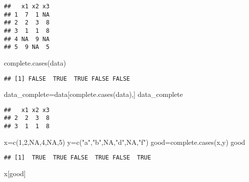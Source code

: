 \documentclass[
]{article}
\newenvironment{Shaded}{\begin{snugshade}}{\end{snugshade}}
\newcommand{\ConstantTok}[1]{\textcolor[rgb]{0.00,0.00,0.00}{#1}}
\newcommand{\DecValTok}[1]{\textcolor[rgb]{0.00,0.00,0.81}{#1}}
\newcommand{\FunctionTok}[1]{\textcolor[rgb]{0.00,0.00,0.00}{#1}}
\newcommand{\NormalTok}[1]{#1}
\newcommand{\OtherTok}[1]{\textcolor[rgb]{0.56,0.35,0.01}{#1}}
\newcommand{\StringTok}[1]{\textcolor[rgb]{0.31,0.60,0.02}{#1}}
\begin{document}
\begin{verbatim}
##   x1 x2 x3
## 1  7  1 NA
## 2  2  3  8
## 3  1  1  8
## 4 NA  9 NA
## 5  9 NA  5
\end{verbatim}

\begin{Shaded}
\begin{Highlighting}[]
\FunctionTok{complete.cases}\NormalTok{(data)}
\end{Highlighting}
\end{Shaded}

\begin{verbatim}
## [1] FALSE  TRUE  TRUE FALSE FALSE
\end{verbatim}

\begin{Shaded}
\begin{Highlighting}[]
\NormalTok{data\_complete}\OtherTok{=}\NormalTok{data[}\FunctionTok{complete.cases}\NormalTok{(data),]}
\NormalTok{data\_complete}
\end{Highlighting}
\end{Shaded}

\begin{verbatim}
##   x1 x2 x3
## 2  2  3  8
## 3  1  1  8
\end{verbatim}

\begin{Shaded}
\begin{Highlighting}[]
\NormalTok{x}\OtherTok{=}\FunctionTok{c}\NormalTok{(}\DecValTok{1}\NormalTok{,}\DecValTok{2}\NormalTok{,}\ConstantTok{NA}\NormalTok{,}\DecValTok{4}\NormalTok{,}\ConstantTok{NA}\NormalTok{,}\DecValTok{5}\NormalTok{)}
\NormalTok{y}\OtherTok{=}\FunctionTok{c}\NormalTok{(}\StringTok{"a"}\NormalTok{,}\StringTok{"b"}\NormalTok{,}\ConstantTok{NA}\NormalTok{,}\StringTok{"d"}\NormalTok{,}\ConstantTok{NA}\NormalTok{,}\StringTok{"f"}\NormalTok{)}
\NormalTok{good}\OtherTok{=}\FunctionTok{complete.cases}\NormalTok{(x,y)}
\NormalTok{good}
\end{Highlighting}
\end{Shaded}

\begin{verbatim}
## [1]  TRUE  TRUE FALSE  TRUE FALSE  TRUE
\end{verbatim}

\begin{Shaded}
\begin{Highlighting}[]
\NormalTok{x[good]}
\end{Highlighting}
\end{Shaded}
\end{document}
